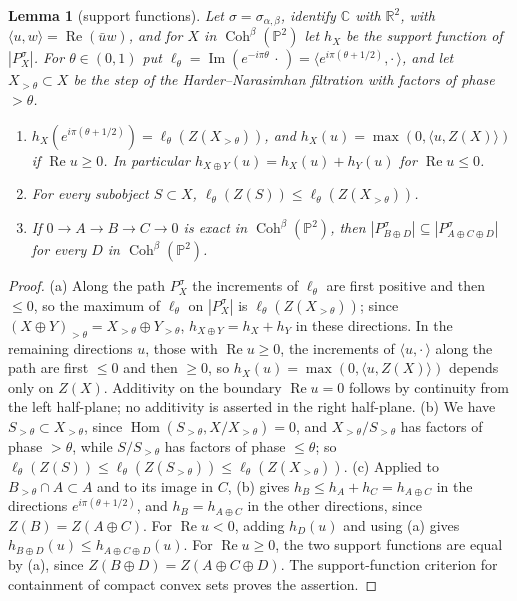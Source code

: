 \documentclass[11pt]{amsart}
\newtheorem{lemma}[theorem]{Lemma}
\theoremstyle{definition}
\theoremstyle{remark}
\newcommand{\PP}{\mathbb{P}}
\newcommand{\RR}{\mathbb{R}}
\begin{document}
\begin{lemma}[support functions]\label{lem:support}
Let $\sigma=\sigma_{\alpha,\beta}$, identify $\mathbb C$ with $\RR^2$, with $\langle u,w\rangle=\operatorname{Re}(\bar uw)$, and for $X$ in $\operatorname{Coh}^\beta(\PP^2)$ let $h_X$ be the support function of $|P^\sigma_X|$. For $\theta\in(0,1)$ put $\ell_\theta=\operatorname{Im}(e^{-i\pi\theta}\,\cdot\,)=\langle e^{i\pi(\theta+1/2)},\cdot\,\rangle$, and let $X_{>\theta}\subset X$ be the step of the Harder--Narasimhan filtration with factors of phase $>\theta$.
\begin{enumerate}[label=\textup{(\alph*)}]
\item $h_X(e^{i\pi(\theta+1/2)})=\ell_\theta(Z(X_{>\theta}))$, and $h_X(u)=\max(0,\langle u,Z(X)\rangle)$ if $\operatorname{Re}u\ge0$. In particular $h_{X\oplus Y}(u)=h_X(u)+h_Y(u)$ for $\operatorname{Re}u\le0$.
\item For every subobject $S\subset X$, $\ell_\theta(Z(S))\le\ell_\theta(Z(X_{>\theta}))$.
\item If $0\to A\to B\to C\to0$ is exact in $\operatorname{Coh}^\beta(\PP^2)$, then $|P^\sigma_{B\oplus D}|\subseteq|P^\sigma_{A\oplus C\oplus D}|$ for every $D$ in $\operatorname{Coh}^\beta(\PP^2)$.
\end{enumerate}
\end{lemma}

\begin{proof}
(a) Along the path $P^\sigma_X$ the increments of $\ell_\theta$ are first positive and then $\le0$, so the maximum of $\ell_\theta$ on $|P^\sigma_X|$ is $\ell_\theta(Z(X_{>\theta}))$; since $(X\oplus Y)_{>\theta}=X_{>\theta}\oplus Y_{>\theta}$, $h_{X\oplus Y}=h_X+h_Y$ in these directions. In the remaining directions $u$, those with $\operatorname{Re}u\ge0$, the increments of $\langle u,\cdot\,\rangle$ along the path are first $\le0$ and then $\ge0$, so $h_X(u)=\max(0,\langle u,Z(X)\rangle)$ depends only on $Z(X)$. Additivity on the boundary $\operatorname{Re}u=0$ follows by continuity from the left half-plane; no additivity is asserted in the right half-plane. (b) We have $S_{>\theta}\subset X_{>\theta}$, since $\operatorname{Hom}(S_{>\theta},X/X_{>\theta})=0$, and $X_{>\theta}/S_{>\theta}$ has factors of phase $>\theta$, while $S/S_{>\theta}$ has factors of phase $\le\theta$; so $\ell_\theta(Z(S))\le\ell_\theta(Z(S_{>\theta}))\le\ell_\theta(Z(X_{>\theta}))$. (c) Applied to $B_{>\theta}\cap A\subset A$ and to its image in $C$, (b) gives $h_B\le h_A+h_C=h_{A\oplus C}$ in the directions $e^{i\pi(\theta+1/2)}$, and $h_B=h_{A\oplus C}$ in the other directions, since $Z(B)=Z(A\oplus C)$. For $\operatorname{Re}u<0$, adding $h_D(u)$ and using (a) gives $h_{B\oplus D}(u)\le h_{A\oplus C\oplus D}(u)$. For $\operatorname{Re}u\ge0$, the two support functions are equal by (a), since $Z(B\oplus D)=Z(A\oplus C\oplus D)$. The support-function criterion for containment of compact convex sets proves the assertion.
\end{proof}
\end{document}
